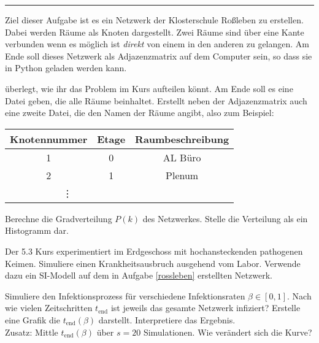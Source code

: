 

\usepackage{pstricks,pst-node,pst-tree}
\usepackage{graphicx}




  \sheet[%
  number=4,
      topic={Infektionsdynamiken},
    ]

\vspace{-1cm}
\noindent\rule{12cm}{0.4pt}

  \exercise[%
  topic = Ein Netzwerk der Klosterschule Rossleben 
    ]

\label{rossleben}

Ziel dieser Aufgabe ist es ein Netzwerk der Klosterschule Ro\ss{}leben zu erstellen. Dabei werden R\"aume als Knoten dargestellt. Zwei R\"aume sind \"uber eine Kante verbunden wenn es m\"oglich ist \emph{direkt} von einem in den anderen zu gelangen. Am Ende soll dieses Netzwerk als Adjazenzmatrix auf dem Computer sein, so dass sie in Python geladen werden kann.

 \subexercise[%
  topic=Das Problem aufteilen,
    ]
\"uberlegt, wie ihr das Problem im Kurs aufteilen k\"onnt. Am Ende soll es eine Datei geben, die alle R\"aume beinhaltet. Erstellt neben der Adjazenzmatrix auch eine zweite Datei, die den Namen der R\"aume angibt, also zum Beispiel:

\begin{tabular}[h]{c|c|c}
Knotennummer & Etage & Raumbeschreibung \\ \hline
1 & 0 & AL B\"uro\\
2 & 1 & Plenum\\
\multicolumn{2}{c}{\vdots}
\end{tabular}



 \subexercise[%
  topic= Gradverteilung,
    ]

Berechne die Gradverteilung $P(k)$ des Netzwerkes. Stelle die Verteilung als ein Histogramm dar.

\exercise[%
  topic =  Krankheitsausbruch in der Akademie
    ]

Der 5.3 Kurs experimentiert im Erdgeschoss mit hochansteckenden pathogenen Keimen. Simuliere einen Krankheitsausbruch ausgehend vom Labor. Verwende dazu ein SI-Modell auf dem in Aufgabe \ref{rossleben} erstellten Netzwerk.

\subexercise[%
  topic= Vollst\"andige Infektion,
    ]

Simuliere den Infektionsprozess f\"ur verschiedene Infektionsraten $\beta \in [0,1]$. Nach wie vielen Zeitschritten $t_{\mathrm{end}}$ ist jeweils das gesamte Netzwerk infiziert? Erstelle eine Grafik die $t_{\mathrm{end}}(\beta)$ darstellt. Interpretiere das Ergebnis.\\
Zusatz: Mittle $t_{\mathrm{end}}(\beta)$ \"uber $s=20$ Simulationen. Wie ver\"andert sich die Kurve?


